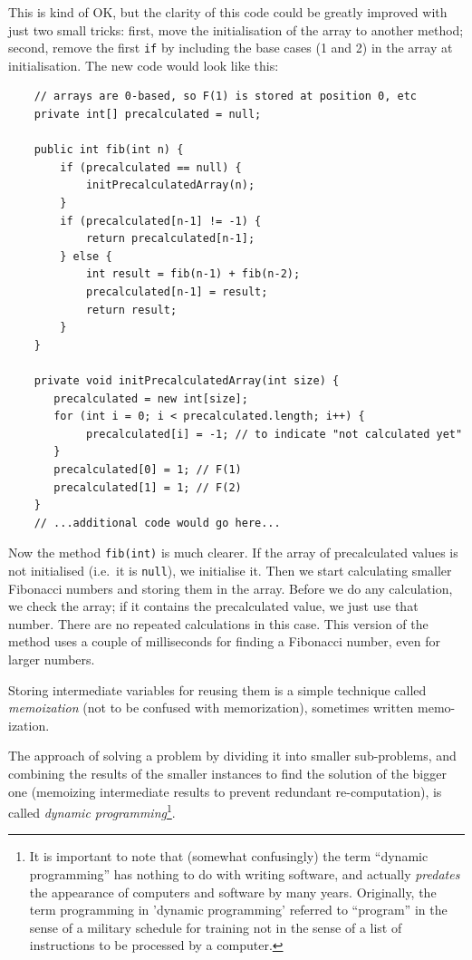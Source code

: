 This is kind of OK, but the clarity of this code could be greatly
improved with just two small tricks: first, move the initialisation
of the array to another method; second, remove the first \verb+if+ by
including the base cases (1 and 2) in the array at initialisation. The
new code would look like this: 

\begin{verbatim}
    // arrays are 0-based, so F(1) is stored at position 0, etc
    private int[] precalculated = null;

    public int fib(int n) {
        if (precalculated == null) {
            initPrecalculatedArray(n);
        }
        if (precalculated[n-1] != -1) {
            return precalculated[n-1];
        } else {
            int result = fib(n-1) + fib(n-2);
            precalculated[n-1] = result;
            return result;
        }
    }

    private void initPrecalculatedArray(int size) {
       precalculated = new int[size];
       for (int i = 0; i < precalculated.length; i++) {
            precalculated[i] = -1; // to indicate "not calculated yet"
       }
       precalculated[0] = 1; // F(1)
       precalculated[1] = 1; // F(2)
    }
    // ...additional code would go here...
\end{verbatim}

Now the method \verb+fib(int)+ is much clearer. If the array of
precalculated values is not initialised (i.e.~it is \verb+null+), we
initialise it. Then we start calculating smaller Fibonacci numbers and
storing them in the array. Before we do any calculation, we check the
array; if it contains the precalculated value, we just use that
number. There are no repeated calculations in this case. This version of the
method uses a couple of milliseconds for finding a Fibonacci number,
even for larger numbers. 

Storing intermediate variables for reusing them is a simple technique
called \emph{memoization} (not to be confused with memorization),
sometimes written memo-ization. 

The approach of solving a problem by dividing it into smaller
sub-problems, and combining the results of the smaller instances to
find the solution of the bigger one (memoizing intermediate results to
prevent redundant re-computation), is called \emph{dynamic
  programming}\footnote{It is important to note that (somewhat
  confusingly) the term ``dynamic programming'' has nothing to do with
  writing software, and actually \emph{predates} the appearance of
  computers and software by many years. 
  Originally, the term programming in 'dynamic programming'
  referred to ``program'' in the sense of a military schedule for
  training not in the sense of a list of instructions to be processed
  by a computer.}.


